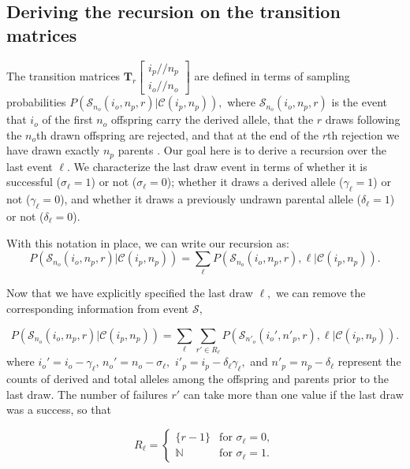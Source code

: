 \documentclass[review]{elsarticle}
\newcommand{\dslash}{/\!\!/}
\newcommand{\Coalc}[4]{\begin{bmatrix}#1\dslash #2 \\ #3\dslash #4 \end{bmatrix}}
\newcommand{\CC}{\mathcal{C}}
\newcommand{\ms}{\mathcal{S}}
\begin{document}
\subsection{Deriving the recursion on the transition matrices}
\label{subsec_apx_tpm_deriv}

The transition matrices $\mathbf{T}_{r}\Coalc{i_p}{n_p}{i_o}{n_o}$ are defined in terms of sampling
probabilities $P(\ms_{n_o}(i_o, n_p, r) | \CC{(i_p,n_p)} ),$ where $\ms_{n_o}(i_o,n_p, r)$ is the
event that $i_o$ of the first $n_o$ offspring carry the derived allele, that the $r$
draws following the $n_o$th drawn offspring are rejected, and that at the end of the $r$th
rejection we have drawn exactly $n_p$ parents . Our goal here is to derive a recursion
over the last event $\ell$. We characterize the last draw event in terms of whether it is
successful ($\sigma_\ell=1$) or not ($\sigma_\ell=0$); whether it draws a derived allele
($\gamma_\ell=1$) or not ($\gamma_\ell=0$), and whether it draws a previously undrawn parental
allele ($\delta_\ell=1$) or not ($\delta_\ell=0$).

With this notation in place, we can write our recursion as: 
 \begin{equation}
  P( \ms_{n_o}(i_o, n_p, r) | \CC{(i_p,n_p)} ) = \sum_\ell P( \ms_{n_o}(i_o, n_p, r),\ell | \CC(i_p,n_p) ) . 
 \end{equation}

Now that we have explicitly specified the last draw $\ell,$ we can remove the corresponding
information from event $\ms,$ 

\begin{equation}
  P(\ms_{n_o}(i_o, n_p, r) | \CC{(i_p,n_p)} ) = \sum_\ell \sum_{r' \in R_\ell} P(\ms_{n'_o}(i_o',
  n'_p, r),\ell | \CC{(i_p,n_p)} ) . 
\end{equation}
where $i_o' = i_o-\gamma_\ell$,  $n_o' = n_o-\sigma_\ell,$ $i'_p= i_p - \delta_\ell \gamma_\ell,$  and $n'_p  = n_p - \delta_\ell$ represent the 
counts of derived and total alleles among the offspring and parents prior to the last draw. 
 The number of failures $r'$ can take more than one value if the last draw was a success,
so that 

\begin{equation}
  R_\ell = \begin{cases} 
    \{r-1\}    & \text{for } \sigma_\ell = 0, \\
    \mathbb{N} & \text{for } \sigma_\ell = 1.
  \end{cases}
\end{equation} 
\end{document}
